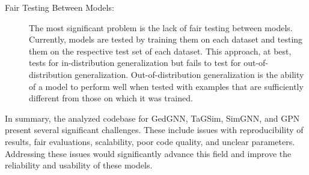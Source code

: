 \documentclass[../Thesis.tex]{subfiles}
\begin{document}
\begin{description}
    \item[Fair Testing Between Models:] The most significant problem is the lack of fair testing between models. Currently, models are tested by training them on each dataset and testing them on the respective test set of each dataset. This approach, at best, tests for in-distribution generalization but fails to test for out-of-distribution generalization. Out-of-distribution generalization is the ability of a model to perform well when tested with examples that are sufficiently different from those on which it was trained.
\end{description}

In summary, the analyzed codebase for GedGNN, TaGSim, SimGNN, and GPN present several significant challenges. These include issues with reproducibility of results, fair evaluations, scalability, poor code quality, and unclear parameters. Addressing these issues would significantly advance this field and improve the reliability and usability of these models.
	
\end{document}
